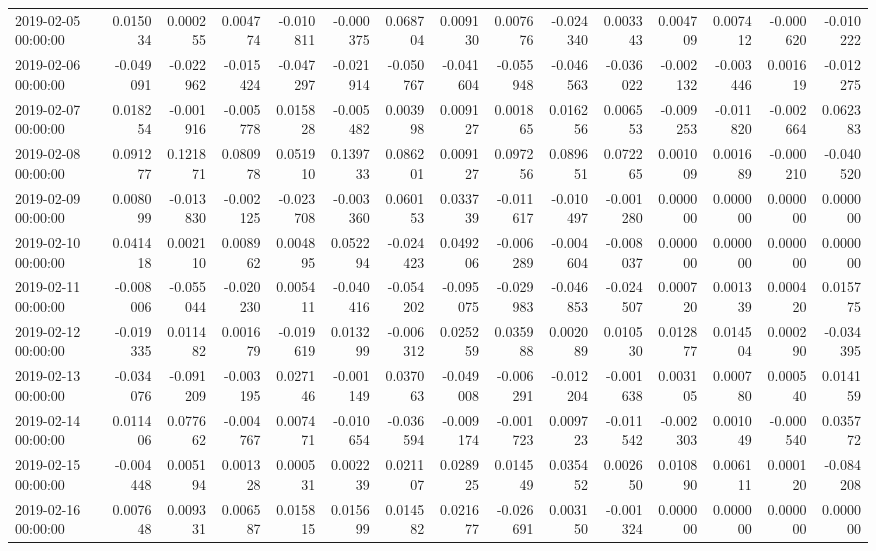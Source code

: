 \begin{tabular}{lrrrrrrrrrrrrrr}
2019-02-05 00:00:00 & 0.015034 & 0.000255 & 0.004774 & -0.010811 & -0.000375 & 0.068704 & 0.009130 & 0.007676 & -0.024340 & 0.003343 & 0.004709 & 0.007412 & -0.000620 & -0.010222 \\
2019-02-06 00:00:00 & -0.049091 & -0.022962 & -0.015424 & -0.047297 & -0.021914 & -0.050767 & -0.041604 & -0.055948 & -0.046563 & -0.036022 & -0.002132 & -0.003446 & 0.001619 & -0.012275 \\
2019-02-07 00:00:00 & 0.018254 & -0.001916 & -0.005778 & 0.015828 & -0.005482 & 0.003998 & 0.009127 & 0.001865 & 0.016256 & 0.006553 & -0.009253 & -0.011820 & -0.002664 & 0.062383 \\
2019-02-08 00:00:00 & 0.091277 & 0.121871 & 0.080978 & 0.051910 & 0.139733 & 0.086201 & 0.009127 & 0.097256 & 0.089651 & 0.072265 & 0.001009 & 0.001689 & -0.000210 & -0.040520 \\
2019-02-09 00:00:00 & 0.008099 & -0.013830 & -0.002125 & -0.023708 & -0.003360 & 0.060153 & 0.033739 & -0.011617 & -0.010497 & -0.001280 & 0.000000 & 0.000000 & 0.000000 & 0.000000 \\
2019-02-10 00:00:00 & 0.041418 & 0.002110 & 0.008962 & 0.004895 & 0.052294 & -0.024423 & 0.049206 & -0.006289 & -0.004604 & -0.008037 & 0.000000 & 0.000000 & 0.000000 & 0.000000 \\
2019-02-11 00:00:00 & -0.008006 & -0.055044 & -0.020230 & 0.005411 & -0.040416 & -0.054202 & -0.095075 & -0.029983 & -0.046853 & -0.024507 & 0.000720 & 0.001339 & 0.000420 & 0.015775 \\
2019-02-12 00:00:00 & -0.019335 & 0.011482 & 0.001679 & -0.019619 & 0.013299 & -0.006312 & 0.025259 & 0.035988 & 0.002089 & 0.010530 & 0.012877 & 0.014504 & 0.000290 & -0.034395 \\
2019-02-13 00:00:00 & -0.034076 & -0.091209 & -0.003195 & 0.027146 & -0.001149 & 0.037063 & -0.049008 & -0.006291 & -0.012204 & -0.001638 & 0.003105 & 0.000780 & 0.000540 & 0.014159 \\
2019-02-14 00:00:00 & 0.011406 & 0.077662 & -0.004767 & 0.007471 & -0.010654 & -0.036594 & -0.009174 & -0.001723 & 0.009723 & -0.011542 & -0.002303 & 0.001049 & -0.000540 & 0.035772 \\
2019-02-15 00:00:00 & -0.004448 & 0.005194 & 0.001328 & 0.000531 & 0.002239 & 0.021107 & 0.028925 & 0.014549 & 0.035452 & 0.002650 & 0.010890 & 0.006111 & 0.000120 & -0.084208 \\
2019-02-16 00:00:00 & 0.007648 & 0.009331 & 0.006587 & 0.015815 & 0.015699 & 0.014582 & 0.021677 & -0.026691 & 0.003150 & -0.001324 & 0.000000 & 0.000000 & 0.000000 & 0.000000 \\

\end{tabular}
